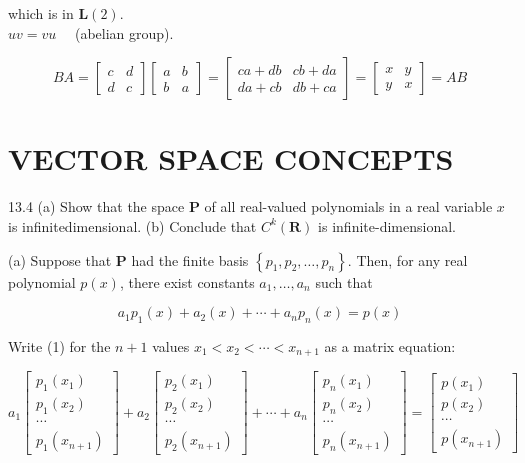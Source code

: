 \documentclass[10pt]{article}
\begin{document}
which is in $\mathbf{L}(2)$.\\
$u v=v u \quad$ (abelian group).

\[
B A=\left[\begin{array}{ll}
c & d  \tag{5}\\
d & c
\end{array}\right]\left[\begin{array}{ll}
a & b \\
b & a
\end{array}\right]=\left[\begin{array}{ll}
c a+d b & c b+d a \\
d a+c b & d b+c a
\end{array}\right]=\left[\begin{array}{ll}
x & y \\
y & x
\end{array}\right]=A B
\]

\section*{VECTOR SPACE CONCEPTS}
13.4 (a) Show that the space $\mathbf{P}$ of all real-valued polynomials in a real variable $x$ is infinitedimensional. (b) Conclude that $C^{k}(\mathbf{R})$ is infinite-dimensional.

(a) Suppose that $\mathbf{P}$ had the finite basis $\left\{p_{1}, p_{2}, \ldots, p_{n}\right\}$. Then, for any real polynomial $p(x)$, there exist constants $a_{1}, \ldots, a_{n}$ such that


\begin{equation*}
a_{1} p_{1}(x)+a_{2}(x)+\cdots+a_{n} p_{n}(x)=p(x) \tag{1}
\end{equation*}


Write (1) for the $n+1$ values $x_{1}<x_{2}<\cdots<x_{n+1}$ as a matrix equation:

\[
a_{1}\left[\begin{array}{c}
p_{1}\left(x_{1}\right)  \tag{2}\\
p_{1}\left(x_{2}\right) \\
\cdots \\
p_{1}\left(x_{n+1}\right)
\end{array}\right]+a_{2}\left[\begin{array}{c}
p_{2}\left(x_{1}\right) \\
p_{2}\left(x_{2}\right) \\
\cdots \\
p_{2}\left(x_{n+1}\right)
\end{array}\right]+\cdots+a_{n}\left[\begin{array}{c}
p_{n}\left(x_{1}\right) \\
p_{n}\left(x_{2}\right) \\
\cdots \\
p_{n}\left(x_{n+1}\right)
\end{array}\right]=\left[\begin{array}{c}
p\left(x_{1}\right) \\
p\left(x_{2}\right) \\
\cdots \\
p\left(x_{n+1}\right)
\end{array}\right]
\]
\end{document}
